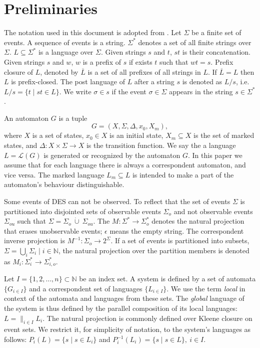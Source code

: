 \documentclass[a4paper, 10pt, conference]{ieeeconf}
\begin{document}
\section{Preliminaries}
\label{sec:Preliminaries}
The notation used in this document is adopted from
\cite{cassandras_introduction_2010}.
Let $\Sigma$ be a finite set of events. A sequence of events is a string.
$\Sigma^*$ denotes a set of all finite strings over $\Sigma$.
$L\subseteq\Sigma^*$ is a language over $\Sigma$. Given strings $s$ and $t$,
$st$ is their concatenation. Given strings $s$ and $w$, $w$ is a prefix of $s$
if exists $t$ such that $wt = s$. Prefix closure of $L$, denoted by
$\overline{L}$ is a set of all prefixes of all strings in $L$.
If $\overline{L} = L$ then $L$ is prefix-closed. The post language of $L$ after
a string $s$ is denoted as $L/s$, i.e. $L/s = \{t\mid st \in L\}$. We
write $\sigma \in s$ if the event $\sigma \in \Sigma$ appears in the string $s
\in \Sigma^*$.

An automaton $G$ is a tuple $$G=(X,\Sigma,\Delta,x_0, X_m),$$ where $X$ is a
set of states, $x_0 \in X$ is an initial state, $X_m \subseteq X$ is the set of
marked states, and $\Delta: X \times \Sigma \rightarrow X$ is the transition
function.
We say the a language $L = \mathcal{L}(G)$ is generated or recognized by the
automaton $G$. In this paper we assume that for each language there is always a
correspondent automaton, and vice versa. The marked language $L_m \subseteq L$
is intended to make a part of the automaton's behaviour distinguishable.

Some events of DES can not be observed. To reflect that the set of events
$\Sigma$ is partitioned into disjointed sets of observable events $\Sigma_o$ and
not observable events $\Sigma_{ou}$ such that $\Sigma = \Sigma_o~\dot{\cup}~
\Sigma_{ou}$.
The $M: \Sigma^* \rightarrow \Sigma_o^*$ denotes the natural projection that
erases unobservable events; $\epsilon$ means the empty string. The
correspondent inverse projection is $M^{-1}: \Sigma_o \rightarrow 2^\Sigma$. If
a set of events is partitioned into subsets, $\Sigma = \bigcup_i
\Sigma_{i} \mid i \in \mathbb{N}$, the natural projection over the partition
members is denoted as $M_i: \Sigma_i^* \rightarrow \Sigma_{i,o}^*$.

Let $I = \{1,2,\ldots,n\} \subset  \mathbb{N}$ be an index set. A system is
defined by a set of automata $\{G_{i \in I}\}$ and a correspondent set
of languages $\{L_{i \in I}\}$. We use the term \emph{local} in context
of the automata and languages from these sets. The \emph{global} language of the
system is thus defined by the parallel composition of its local languages: $L =
\parallel_{i \in I} L_i$.
The natural projection is commonly defined over Kleene closure on event sets.
We restrict it, for simplicity of notation, to the system's languages as
follows: $P_i(L) = \{s\mid s\in L_{i}\}$ and $P_i^{-1}(L_{i}) = \{s \mid s \in
L\}, ~i \in I$.
\end{document}
